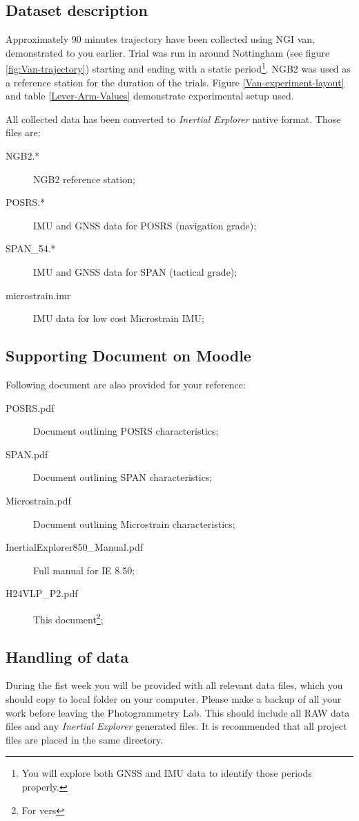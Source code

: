 \documentclass[british]{book}
\begin{document}
\subsection{Dataset description}

Approximately 90 minutes trajectory have been collected using NGI van, demonstrated to you earlier. Trial was run in around Nottingham (see figure \ref{fig:Van-trajectory}) starting and ending with a static period\footnote{You will explore both GNSS and IMU data to identify those periods properly.}. NGB2 was used as a reference station for the duration of the trials.
Figure \ref{Van-experiment-layout} and table \ref{Lever-Arm-Values} demonstrate experimental setup used.

All collected data has been converted to \emph{Inertial Explorer} native format. Those files are:
	\begin{description}
	\item [{NGB2.{*}}] NGB2 reference station;
	\item [{POSRS.{*}}] IMU and GNSS data for POSRS (navigation grade);
	\item [{SPAN\_54.{*}}] IMU and GNSS data for SPAN (tactical grade);
	\item [{microstrain.imr}] IMU data for low cost Microstrain IMU;
	\end{description}


\subsection{Supporting Document on Moodle}

Following document are also provided for your reference:

	\begin{description}
	\item [{POSRS.pdf}] Document outlining POSRS characteristics;
	\item [{SPAN.pdf}] Document outlining SPAN characteristics;
	\item [{Microstrain.pdf}] Document outlining Microstrain characteristics;
	\item [{InertialExplorer850\_Manual.pdf}] Full manual for IE 8.50;
	\item [{H24VLP\_P2.pdf}] This document\footnote{For vers};
	\end{description}







\subsection{Handling of data}
During the fist week you will be provided with all relevant data files, which you should copy to local folder on your computer. Please make a backup of all your work before leaving the Photogrammetry Lab. This should include all RAW data files and any \emph{Inertial Explorer} generated files. It is recommended that all project files are placed in the same directory.
\end{document}
